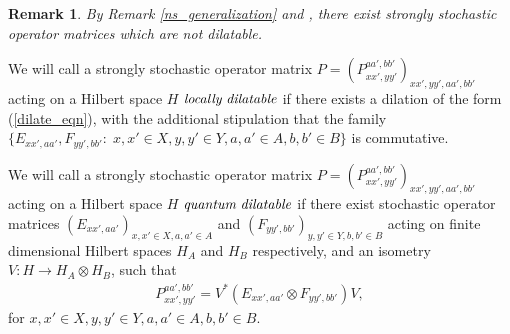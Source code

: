 \documentclass[11pt]{amsart}
\newtheorem{remark}[theorem]{Remark}
\begin{document}
\begin{remark}
\rm By Remark \ref{ns_generalization} and \cite[Remark 5.3]{gt_one}, there exist strongly stochastic operator matrices which are not dilatable.
\end{remark}

We will call a strongly stochastic operator matrix $P = (P_{xx', yy'}^{aa', bb'})_{xx', yy', aa', bb'}$ acting on a Hilbert space $H$ ${\it locally \; dilatable}$ if there exists a dilation of the form (\ref{dilate_eqn}), with the additional stipulation that the family $\{E_{xx', aa'}, F_{yy', bb'}: \; x, x' \in X, y, y' \in Y, a, a' \in A, b, b' \in B\}$ is commutative. 

We will call a strongly stochastic operator matrix $P = (P_{xx', yy'}^{aa', bb'})_{xx', yy', aa', bb'}$ acting on a Hilbert space $H$ ${\it quantum \; dilatable}$ if there exist stochastic operator matrices $(E_{xx', aa'})_{x, x' \in X, a, a' \in A}$ and $(F_{yy', bb'})_{y, y' \in Y, b, b' \in B}$ acting on finite dimensional Hilbert spaces $H_{A}$ and $H_{B}$ respectively, and an isometry $V: H\rightarrow H_{A}\otimes H_{B}$, such that
\begin{gather}\label{qdilate_eqn}
	P_{xx', yy'}^{aa', bb'} = V^{*}(E_{xx', aa'}\otimes F_{yy', bb'})V, 
\end{gather}
\noindent for $x, x' \in X, y, y' \in Y, a, a' \in A, b, b' \in B$.
\end{document}
